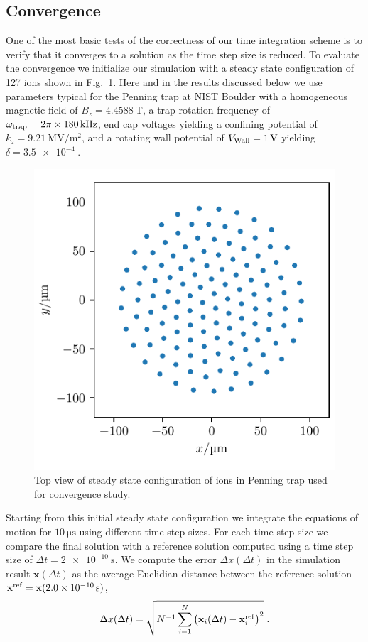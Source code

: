\documentclass[aps, pra, preprint]{revtex4-1}
\begin{document}
\subsection{Convergence}

One of the most basic tests of the correctness of our time
integration scheme is to verify that it converges to a solution
as the time step size is reduced. To evaluate the convergence we
initialize our simulation with a steady state configuration of
127 ions shown in Fig.~\ref{fig:initial_state_top_view}. Here and
in the results discussed below we use parameters typical for the
Penning trap at NIST Boulder with a homogeneous magnetic field of
$B_z=\SI{4.4588}{\tesla}$, a trap rotation frequency of
$\omega_{\rm trap}=2\pi\times \SI{180}{\kilo \hertz}$, end cap
voltages yielding a confining potential of
$k_z=\SI{9.21}{\mega\volt/\meter^2}$, and a rotating wall
potential of $V_{\rm Wall} = \SI{1}{\volt}$ yielding
$\delta=\SI{3.5e-4}{}$.
\begin{figure}
  \includegraphics{./figures/fig_initial_state_top_view.pdf}
  \caption{Top view of steady state configuration of ions in
    Penning trap used for convergence study.}
  \label{fig:initial_state_top_view}
\end{figure}

Starting from this initial steady state configuration we
integrate the equations of motion for $\SI{10}{\us}$ using
different time step sizes. For each time step size we compare the
final solution with a reference solution computed using a time
step size of $\Delta t = \SI{2e-10}{\second}$. We compute the
error $\Delta x(\Delta t)$ in the simulation result
$\mathbf{x}(\Delta t)$ as the average Euclidian distance between
the reference solution $\mathbf{x}^{\rm
  ref}=\mathbf{x}(\SI{2.0e-10}{\second})$,
\begin{equation}
  \Delta x(\Delta t) =
  \sqrt{N^{-1}\sum_{i=1}^N\left(
      \mathbf{x}_i(\Delta t)-\mathbf{x}_i^{\rm ref}\right)^2}\;.
\end{equation}
\end{document}
